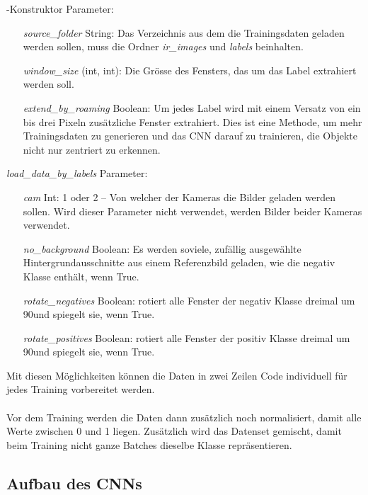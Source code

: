 \noindent -Konstruktor Parameter:
\begin{itemize}[leftmargin=*, labelindent=3cm, labelsep=1cm]
	\item[\textit{source\_folder}] String: Das Verzeichnis aus dem die Trainingsdaten geladen werden sollen, muss die Ordner \textit{ir\_images} und \textit{labels} beinhalten.
	\item[\textit{window\_size}] (int, int): Die Grösse des Fensters, das um das Label extrahiert werden soll.
	\item[\textit{extend\_by\_roaming}] Boolean: Um jedes Label wird mit einem Versatz von ein bis drei Pixeln zusätzliche Fenster extrahiert. Dies ist eine Methode, um mehr Trainingsdaten zu generieren und das CNN darauf zu trainieren, die Objekte nicht nur zentriert zu erkennen.
\end{itemize}
\vspace{2em}
\noindent\textit{load\_data\_by\_labels} Parameter:
\begin{itemize}[leftmargin=*,labelindent=3cm, labelsep=1cm]
		\item[\textit{cam}] Int: 1 oder 2 -- Von welcher der Kameras die Bilder geladen werden sollen. Wird dieser Parameter nicht verwendet, werden Bilder beider Kameras verwendet.
		\item[\textit{no\_background}] Boolean: Es werden soviele, zufällig ausgewählte Hintergrundausschnitte aus einem Referenzbild geladen, wie die negativ Klasse enthält, wenn True.
		\item[\textit{rotate\_negatives}] Boolean: rotiert alle Fenster der negativ Klasse dreimal um 90\degree und spiegelt sie, wenn True.
		\item[\textit{rotate\_positives}] Boolean: rotiert alle Fenster der positiv Klasse dreimal um 90\degree und spiegelt sie, wenn True.
\end{itemize}

\noindent Mit diesen Möglichkeiten können die Daten in zwei Zeilen Code individuell für jedes Training vorbereitet werden.\\
\\
Vor dem Training werden die Daten dann zusätzlich noch normalisiert, damit alle Werte zwischen 0 und 1 liegen. Zusätzlich wird das Datenset gemischt, damit beim Training nicht ganze Batches dieselbe Klasse repräsentieren.

\subsection{Aufbau des CNNs}

